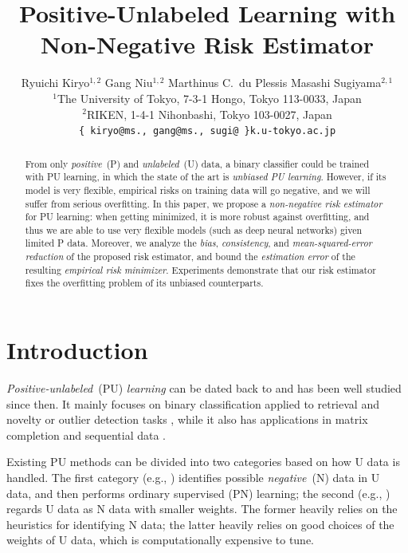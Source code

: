 \documentclass{article}
\title{Positive-Unlabeled Learning with\\Non-Negative Risk Estimator}
\author{Ryuichi Kiryo$^{1,2}$\quad
  Gang Niu$^{1,2}$\quad
  Marthinus C.~du Plessis\quad
  Masashi Sugiyama$^{2,1}$\\
  ${}^1$The University of Tokyo, 7-3-1 Hongo, Tokyo 113-0033, Japan\\
  ${}^2$RIKEN, 1-4-1 Nihonbashi, Tokyo 103-0027, Japan\\
  \texttt{\{ kiryo@ms., gang@ms., sugi@ \}k.u-tokyo.ac.jp}
}
\begin{document}
\maketitle

\begin{abstract}
From only \emph{positive}~(P) and \emph{unlabeled}~(U) data, a binary classifier could be trained with PU learning, in which the state of the art is \emph{unbiased PU learning}. However, if its model is very flexible, empirical risks on training data will go negative, and we will suffer from serious overfitting. In this paper, we propose a \emph{non-negative risk estimator} for PU learning: when getting minimized, it is more robust against overfitting, and thus we are able to use very flexible models (such as deep neural networks) given limited P data. Moreover, we analyze the \emph{bias}, \emph{consistency}, and \emph{mean-squared-error reduction} of the proposed risk estimator, and bound the \emph{estimation error} of the resulting \emph{empirical risk minimizer}. Experiments demonstrate that our risk estimator fixes the overfitting problem of its unbiased counterparts.
\end{abstract}

\section{Introduction}

\emph{Positive-unlabeled}~(PU) \emph{learning} can be dated back to \cite{denis98alt,comite99alt,letouzey00alt} and has been well studied since then. It mainly focuses on binary classification applied to retrieval and novelty or outlier detection tasks \citep{elkan08kdd,ward09biometrics,scott09aistats,blanchard10jmlr}, while it also has applications in matrix completion \citep{hsieh15icml} and sequential data \citep{li09sdm,nguyen11ijcai}.

Existing PU methods can be divided into two categories based on how U data is handled. The first category (e.g., \citep{liu02icml,li03ijcai}) identifies possible \emph{negative}~(N) data in U data, and then performs ordinary supervised (PN) learning; the second (e.g., \citep{lee03icml,liu03icdm}) regards U data as N data with smaller weights. The former heavily relies on the heuristics for identifying N data; the latter heavily relies on good choices of the weights of U data, which is computationally expensive to tune.
\end{document}
